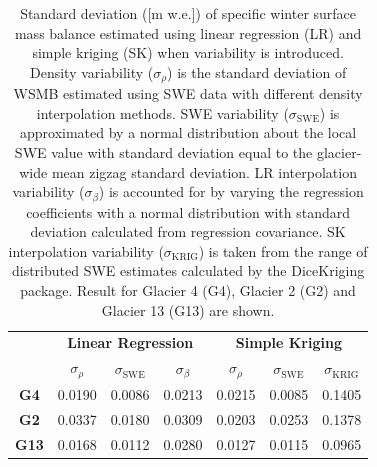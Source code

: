 \documentclass[review,oneside, letterpaper]{igs}
\begin{document}
 \begin{table}[]
\centering
\caption{Standard deviation ([m w.e.]) of specific winter surface mass balance estimated using linear regression (LR) and simple kriging (SK) when variability is introduced. Density variability ($\sigma_{\rho}$) is the standard deviation of WSMB estimated using SWE data with different density interpolation methods. SWE variability ($\sigma_{\mathrm{SWE}}$) is approximated by a normal distribution about the local SWE value with standard deviation equal to the glacier-wide mean zigzag standard deviation. LR interpolation variability ($\sigma_{\beta}$) is accounted for by varying the regression coefficients with a normal distribution with standard deviation calculated from regression covariance. SK interpolation variability ($\sigma_{\mathrm{KRIG}}$) is taken from the range of distributed SWE estimates calculated by the DiceKriging package. Result for Glacier 4 (G4), Glacier 2 (G2) and Glacier 13 (G13) are shown.}
\label{tab:WSMBdistribution_sigma}
\begin{tabular}{ccccccc}
\textbf{} & \multicolumn{3}{c}{\textbf{Linear Regression}} & \multicolumn{3}{c}{\textbf{Simple Kriging}} \\
 & $\sigma_{\rho}$ & $\sigma_{\mathrm{SWE}}$ & $\sigma_{\beta}$ & $\sigma_{\rho}$ & $\sigma_{\mathrm{SWE}}$ & $\sigma_{\mathrm{KRIG}}$ \\
\midrule
\textbf{G4} & 0.0190 & 0.0086 & 0.0213 & 0.0215 & 0.0085 & 0.1405 \\
\textbf{G2} & 0.0337 & 0.0180 & 0.0309 & 0.0203 & 0.0253 & 0.1378 \\
\textbf{G13} & 0.0168 & 0.0112 & 0.0280 & 0.0127 & 0.0115 & 0.0965
\end{tabular}
\end{table}
\end{document}
